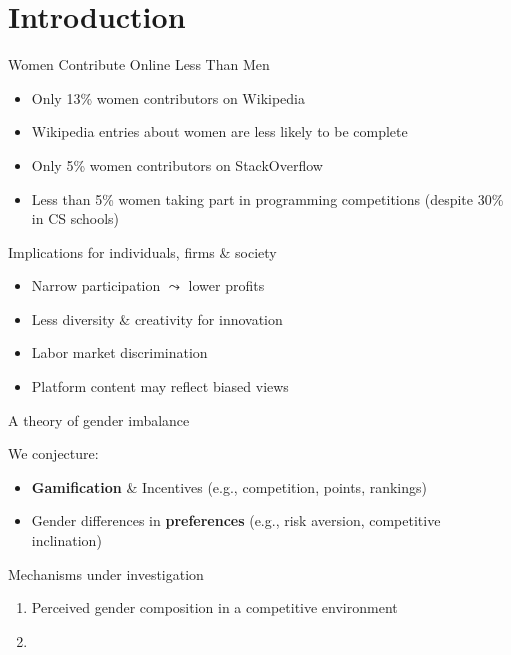 \section{Introduction}\label{introduction}

\begin{frame}{Women Contribute Online Less Than Men}

\begin{itemize}[<+->]
\tightlist
\item
  Only 13\% women contributors on Wikipedia
\item
  Wikipedia entries about women are less likely to be complete
\item
  Only 5\% women contributors on StackOverflow
\item
  Less than 5\% women taking part in programming competitions (despite
  30\% in CS schools)
\end{itemize}

\end{frame}

\begin{frame}{Implications for individuals, firms \& society}

\begin{itemize}[<+->]
\tightlist
\item
  Narrow participation \(\leadsto\) lower profits
\item
  Less diversity \& creativity for innovation
\item
  Labor market discrimination
\item
  Platform content may reflect biased views
\end{itemize}

\end{frame}

\begin{frame}{A theory of gender imbalance}

We conjecture:

\begin{itemize}[<+->]
\tightlist
\item
  \textbf{Gamification} \& Incentives (e.g., competition, points,
  rankings)
\item
  Gender differences in \textbf{preferences} (e.g., risk aversion,
  competitive inclination)
\end{itemize}

Mechanisms under investigation

\begin{enumerate}
\def\labelenumi{\arabic{enumi}.}
\tightlist
\item
  Perceived gender composition in a competitive environment
\item
  \color{gray}{Collaboration incentives under gender imbalance [next study]}
\end{enumerate}

\end{frame}

